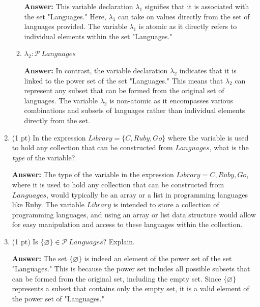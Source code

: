 \documentclass[12pt]{article}
\begin{document}
\begin{spacing}{1.5}
\begin{enumerate}
\begin{enumerate}
		      	      \textbf{Answer:} This variable declaration $\lambda_1$ signifies that it is associated with the set "Languages." Here, $\lambda_1$ can take on values directly from the set of languages provided. The variable $\lambda_1$ is atomic as it directly refers to individual elements within the set "Languages."\\
		      	      		      	      		      	      		      	                  
		      	\item $\lambda_2 : \mathcal{P} \: Languages$
		      	      		      	      		      	      		      	          
		      	      \textbf{Answer:} In contrast, the variable declaration $\lambda_2$ indicates that it is linked to the power set of the set "Languages." This means that $\lambda_2$ can represent any subset that can be formed from the original set of languages. The variable $\lambda_2$ is non-atomic as it encompasses various combinations and subsets of languages rather than individual elements directly from the set.\\
		      	      		      	      		      	      		      	                  
		      \end{enumerate}
		      		      		      		      
		\item (1 pt) In the expression $Library = \{C, Ruby, Go\}$ where the variable is used to hold any collection that can be constructed from $Languages$, what is the \textit{type} of the variable?
		      		      		      		      
		      \textbf{Answer:} The type of the variable in the expression $Library = {C, Ruby, Go}$, where it is used to hold any collection that can be constructed from $Languages$, would typically be an array or a list in programming languages like Ruby. The variable $Library$ is intended to store a collection of programming languages, and using an array or list data structure would allow for easy manipulation and access to these languages within the collection.\\
		      		      		      		                  
		\item (1 pt) Is $\{\varnothing\} \in \mathcal{P} \: Languages$? Explain.
		      		      		      		      
		      \textbf{Answer:} The set $\{\varnothing\}$ is indeed an element of the power set of the set "Languages." This is because the power set includes all possible subsets that can be formed from the original set, including the empty set. Since $\{\varnothing\}$ represents a subset that contains only the empty set, it is a valid element of the power set of "Languages."\\
		      		      		      		                  

\end{enumerate}
\end{spacing}
\end{document}
